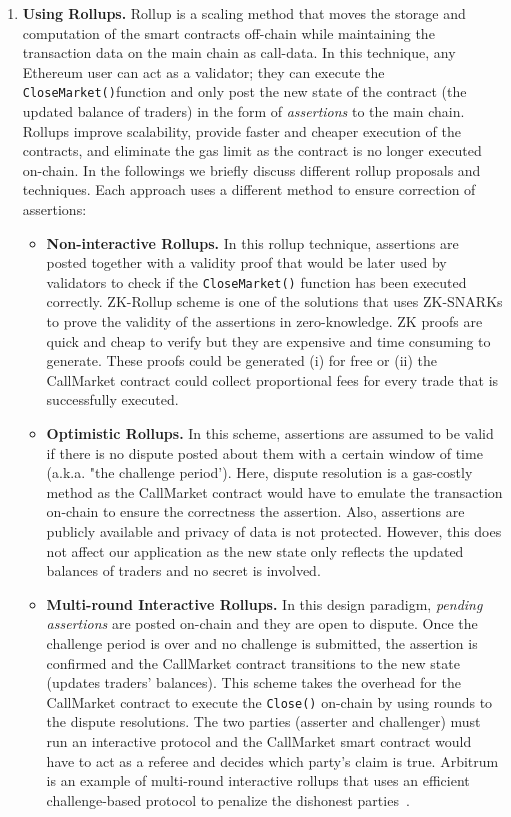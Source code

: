 \begin{enumerate}

\item \textbf{Using Rollups.} Rollup is a scaling method that moves the storage and computation of the smart contracts off-chain while maintaining the transaction data on the main chain as call-data. In this technique, any Ethereum user can act as a validator; they can execute the \texttt{CloseMarket()}function and only post the new state of the contract (the updated balance of traders) in the form of \textit{assertions} to the main chain. Rollups improve scalability, provide faster and cheaper execution of the contracts, and eliminate the gas limit as the contract is no longer executed on-chain.
In the followings we briefly discuss different rollup proposals and techniques. Each approach uses a different method to ensure correction of assertions:


\begin{itemize}

\item \textbf{{Non-interactive Rollups.}} In this rollup technique, assertions are posted together with a validity proof that would be later used by validators to check if the \texttt{CloseMarket()} function has been executed correctly. ZK-Rollup scheme is one of the solutions that uses ZK-SNARKs to prove the validity of the assertions in zero-knowledge. ZK proofs are quick and cheap to verify but they are expensive and time consuming to generate. These proofs could be generated (i) for free or (ii) the CallMarket contract could collect proportional fees for every trade that is successfully executed.

\item \textbf{{Optimistic Rollups.}} In this scheme, assertions are assumed to be valid if there is no dispute posted about them with a certain window of time (a.k.a. "the challenge period'). Here, dispute resolution is a gas-costly method as the CallMarket contract would have to emulate the transaction on-chain to ensure the correctness the assertion. Also, assertions are publicly available and privacy of data is not protected. However, this does not affect our application as the new state only reflects the updated balances of traders and no secret is involved.

\item \textbf {{Multi-round Interactive Rollups.}} In this design paradigm, \textit{pending assertions} are posted on-chain and they are open to dispute. Once the challenge period is over and no challenge is submitted, the assertion is confirmed and the CallMarket contract transitions to the new state (\ie updates traders' balances). This scheme takes the overhead for the CallMarket contract to execute the \texttt{Close()} on-chain by using rounds to the dispute resolutions. The two parties (asserter and challenger) must run an interactive protocol and the CallMarket smart contract would have to act as a referee and decides which party's claim is true. Arbitrum is an example of multi-round interactive rollups that uses an efficient challenge-based protocol to penalize the dishonest parties~\cite{kalodner2018arbitrum}. 


\end{itemize}
\end{enumerate}
